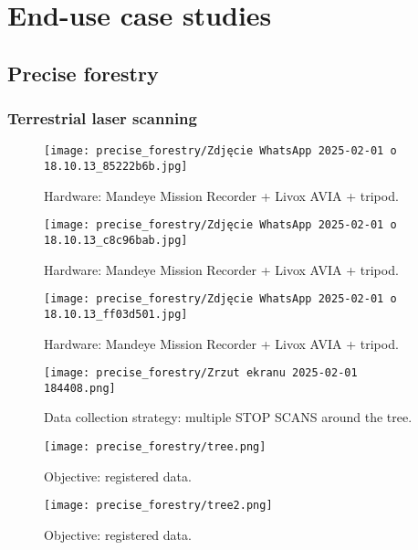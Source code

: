 \chapter{End-use case studies}
\section{Precise forestry}
\subsection{Terrestrial laser scanning}

\begin{figure}[H]
	\centering
	\texttt{[image: precise\_forestry/Zdjęcie WhatsApp 2025-02-01 o 18.10.13\_85222b6b.jpg]}
	\caption{Hardware: Mandeye Mission Recorder + Livox AVIA + tripod.}
	\label{fig:pf1}
\end{figure}

\begin{figure}[H]
	\centering
	\texttt{[image: precise\_forestry/Zdjęcie WhatsApp 2025-02-01 o 18.10.13\_c8c96bab.jpg]}
	\caption{Hardware: Mandeye Mission Recorder + Livox AVIA + tripod.}
	\label{fig:pf2}
\end{figure}

\begin{figure}[H]
	\centering
	\texttt{[image: precise\_forestry/Zdjęcie WhatsApp 2025-02-01 o 18.10.13\_ff03d501.jpg]}
	\caption{Hardware: Mandeye Mission Recorder + Livox AVIA + tripod.}
	\label{fig:pf3}
\end{figure}


\begin{figure}[H]
	\centering
	\texttt{[image: precise\_forestry/Zrzut ekranu 2025-02-01 184408.png]}
	\caption{Data collection strategy: multiple STOP SCANS around the tree.}
	\label{fig:pf22}
\end{figure}

\begin{figure}[H]
	\centering
	\texttt{[image: precise\_forestry/tree.png]}
	\caption{Objective: registered data.}
	\label{fig:pf4}
\end{figure}

\begin{figure}[H]
	\centering
	\texttt{[image: precise\_forestry/tree2.png]}
	\caption{Objective: registered data.}
	\label{fig:pf5}
\end{figure}

